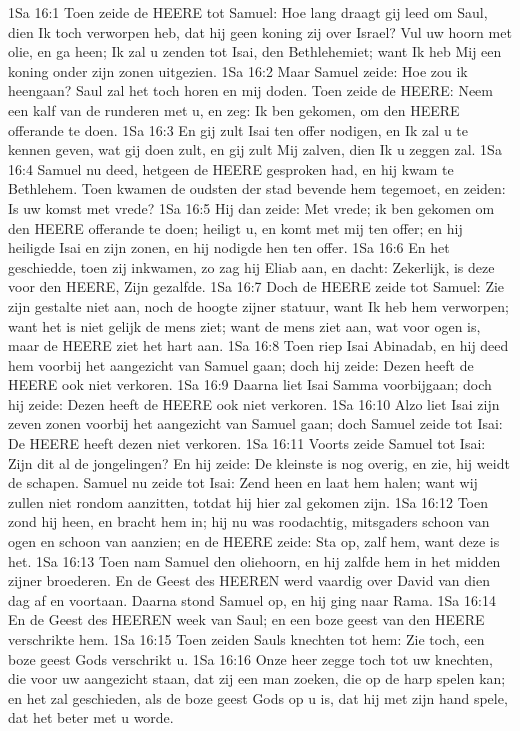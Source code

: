 1Sa 16:1  Toen zeide de HEERE tot Samuel: Hoe lang draagt gij leed om Saul, dien Ik toch verworpen heb, dat hij geen koning zij over Israel? Vul uw hoorn met olie, en ga heen; Ik zal u zenden tot Isai, den Bethlehemiet; want Ik heb Mij een koning onder zijn zonen uitgezien.
1Sa 16:2  Maar Samuel zeide: Hoe zou ik heengaan? Saul zal het toch horen en mij doden. Toen zeide de HEERE: Neem een kalf van de runderen met u, en zeg: Ik ben gekomen, om den HEERE offerande te doen.
1Sa 16:3  En gij zult Isai ten offer nodigen, en Ik zal u te kennen geven, wat gij doen zult, en gij zult Mij zalven, dien Ik u zeggen zal.
1Sa 16:4  Samuel nu deed, hetgeen de HEERE gesproken had, en hij kwam te Bethlehem. Toen kwamen de oudsten der stad bevende hem tegemoet, en zeiden: Is uw komst met vrede?
1Sa 16:5  Hij dan zeide: Met vrede; ik ben gekomen om den HEERE offerande te doen; heiligt u, en komt met mij ten offer; en hij heiligde Isai en zijn zonen, en hij nodigde hen ten offer.
1Sa 16:6  En het geschiedde, toen zij inkwamen, zo zag hij Eliab aan, en dacht: Zekerlijk, is deze voor den HEERE, Zijn gezalfde.
1Sa 16:7  Doch de HEERE zeide tot Samuel: Zie zijn gestalte niet aan, noch de hoogte zijner statuur, want Ik heb hem verworpen; want het is niet gelijk de mens ziet; want de mens ziet aan, wat voor ogen is, maar de HEERE ziet het hart aan.
1Sa 16:8  Toen riep Isai Abinadab, en hij deed hem voorbij het aangezicht van Samuel gaan; doch hij zeide: Dezen heeft de HEERE ook niet verkoren.
1Sa 16:9  Daarna liet Isai Samma voorbijgaan; doch hij zeide: Dezen heeft de HEERE ook niet verkoren.
1Sa 16:10  Alzo liet Isai zijn zeven zonen voorbij het aangezicht van Samuel gaan; doch Samuel zeide tot Isai: De HEERE heeft dezen niet verkoren.
1Sa 16:11  Voorts zeide Samuel tot Isai: Zijn dit al de jongelingen? En hij zeide: De kleinste is nog overig, en zie, hij weidt de schapen. Samuel nu zeide tot Isai: Zend heen en laat hem halen; want wij zullen niet rondom aanzitten, totdat hij hier zal gekomen zijn.
1Sa 16:12  Toen zond hij heen, en bracht hem in; hij nu was roodachtig, mitsgaders schoon van ogen en schoon van aanzien; en de HEERE zeide: Sta op, zalf hem, want deze is het.
1Sa 16:13  Toen nam Samuel den oliehoorn, en hij zalfde hem in het midden zijner broederen. En de Geest des HEEREN werd vaardig over David van dien dag af en voortaan. Daarna stond Samuel op, en hij ging naar Rama.
1Sa 16:14  En de Geest des HEEREN week van Saul; en een boze geest van den HEERE verschrikte hem.
1Sa 16:15  Toen zeiden Sauls knechten tot hem: Zie toch, een boze geest Gods verschrikt u.
1Sa 16:16  Onze heer zegge toch tot uw knechten, die voor uw aangezicht staan, dat zij een man zoeken, die op de harp spelen kan; en het zal geschieden, als de boze geest Gods op u is, dat hij met zijn hand spele, dat het beter met u worde.
